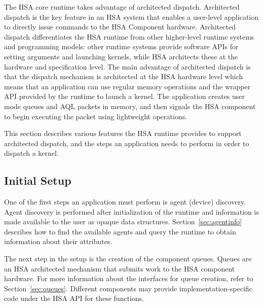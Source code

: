 \documentclass[final]{book}
\begin{document}
The HSA core runtime takes advantage of architected dispatch. Architected
dispatch is the key feature in an HSA system that enables a user-level
application to directly issue commands to the HSA Component hardware.
Architected dispatch differentiates the HSA runtime from other higher-level
runtime systems and programming models: other runtime systems provide
software APIs for setting arguments and launching kernels, while HSA architects
these at the hardware and specification level. The main advantage of architected
dispatch is that the dispatch mechanism is architected at the HSA hardware level
which means that an application can use regular memory operations and the
wrapper API provided by the runtime to launch a kernel. The application creates
user mode queues and AQL packets in memory, and then signals the HSA component
to begin executing the packet using lightweight operations.

This section describes various features the HSA runtime provides to support
architected dispatch, and the steps an application needs to perform in order to
dispatch a kernel.

\subsection{Initial Setup}
One of the first steps an application must perform is agent (device) discovery.
Agent discovery is performed after initialization of the runtime and information
is made available to the user as opaque data
structures. Section~\ref{sec:agentinfo} describes how to find the available
agents and query the runtime to obtain information about their attributes.

The next step in the setup is the creation of the component queues. Queues are an
HSA architected mechanism that submits work to the HSA component hardware. For
more information about the interfaces for queue creation, refer to
Section~\ref{sec:queues}. Different components may provide
implementation-specific code under the HSA API for these functions.

\end{document}
